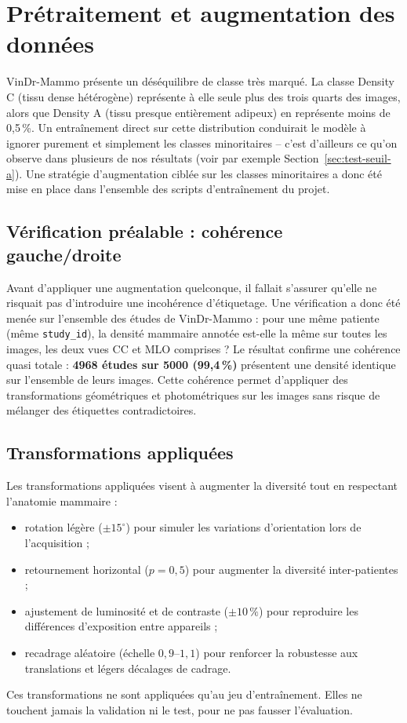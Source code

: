 \documentclass[12pt,a4paper]{report}
\begin{document}
\section{Prétraitement et augmentation des données}
\label{sec:augmentation}

VinDr-Mammo présente un déséquilibre de classe très marqué. La classe
Density C (tissu dense hétérogène) représente à elle seule plus des trois
quarts des images, alors que Density A (tissu presque entièrement adipeux)
en représente moins de 0,5\,\%. Un entraînement direct sur cette
distribution conduirait le modèle à ignorer purement et simplement les
classes minoritaires -- c'est d'ailleurs ce qu'on observe dans plusieurs de
nos résultats (voir par exemple Section~\ref{sec:test-seuil-a}). Une
stratégie d'augmentation ciblée sur les classes minoritaires a donc été
mise en place dans l'ensemble des scripts d'entraînement du projet.

\subsection{Vérification préalable : cohérence gauche/droite}

Avant d'appliquer une augmentation quelconque, il fallait s'assurer qu'elle
ne risquait pas d'introduire une incohérence d'étiquetage. Une vérification
a donc été menée sur l'ensemble des études de VinDr-Mammo : pour une même
patiente (même \texttt{study\_id}), la densité mammaire annotée est-elle la
même sur toutes les images, les deux vues CC et MLO comprises ? Le résultat
confirme une cohérence quasi totale : \textbf{4968 études sur 5000
(99,4\,\%)} présentent une densité identique sur l'ensemble de leurs
images. Cette cohérence permet d'appliquer des transformations géométriques
et photométriques sur les images sans risque de mélanger des étiquettes
contradictoires.

\subsection{Transformations appliquées}

Les transformations appliquées visent à augmenter la diversité tout en
respectant l'anatomie mammaire :
\begin{itemize}
    \item rotation légère ($\pm15^{\circ}$) pour simuler les variations
    d'orientation lors de l'acquisition ;
    \item retournement horizontal ($p=0{,}5$) pour augmenter la diversité
    inter-patientes ;
    \item ajustement de luminosité et de contraste ($\pm10\,\%$) pour
    reproduire les différences d'exposition entre appareils ;
    \item recadrage aléatoire (échelle $0{,}9$--$1{,}1$) pour renforcer la
    robustesse aux translations et légers décalages de cadrage.
\end{itemize}
Ces transformations ne sont appliquées qu'au jeu d'entraînement. Elles ne
touchent jamais la validation ni le test, pour ne pas fausser l'évaluation.
\end{document}

